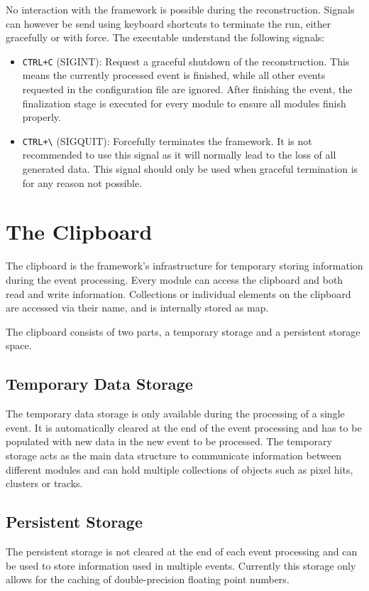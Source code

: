 No interaction with the framework is possible during the reconstruction. Signals can however be send using keyboard shortcuts to terminate the run, either gracefully or with force. The executable understand the following signals:
\begin{itemize}
\item \texttt{CTRL+C} (SIGINT): Request a graceful shutdown of the reconstruction. This means the currently processed event is finished, while all other events requested in the configuration file are ignored. After finishing the event, the finalization stage is executed for every module to ensure all modules finish properly.
\item \texttt{CTRL+\textbackslash} (SIGQUIT): Forcefully terminates the framework. It is not recommended to use this signal as it will normally lead to the loss of all generated data. This signal should only be used when graceful termination is for any reason not possible.
\end{itemize}

\section{The Clipboard}

The clipboard is the framework's infrastructure for temporary storing information during the event processing.
Every module can access the clipboard and both read and write information.
Collections or individual elements on the clipboard are accessed via their name, and is internally stored as map.

The clipboard consists of two parts, a temporary storage and a persistent storage space.

\subsection{Temporary Data Storage}
The temporary data storage is only available during the processing of a single event.
It is automatically cleared at the end of the event processing and has to be populated with new data in the new event to be processed.
The temporary storage acts as the main data structure to communicate information between different modules and can hold multiple collections of \corry objects such as pixel hits, clusters or tracks.

\subsection{Persistent Storage}
The persistent storage is not cleared at the end of each event processing and can be used to store information used in multiple events.
Currently this storage only allows for the caching of double-precision floating point numbers.


